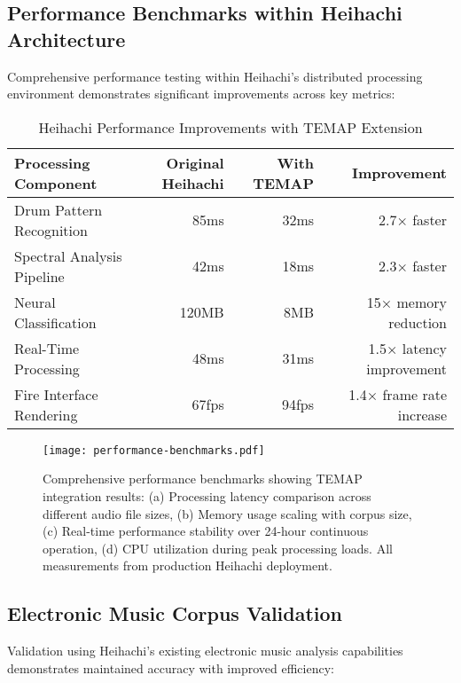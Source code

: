 \documentclass[12pt,a4paper]{article}
\begin{document}
\subsection{Performance Benchmarks within Heihachi Architecture}

Comprehensive performance testing within Heihachi's distributed processing environment demonstrates significant improvements across key metrics:

\begin{table}[ht]
\centering
\caption{Heihachi Performance Improvements with TEMAP Extension}
\begin{tabular}{@{}lrrr@{}}
\toprule
\textbf{Processing Component} & \textbf{Original Heihachi} & \textbf{With TEMAP} & \textbf{Improvement} \\
\midrule
Drum Pattern Recognition & 85ms & 32ms & 2.7× faster \\
Spectral Analysis Pipeline & 42ms & 18ms & 2.3× faster \\
Neural Classification & 120MB & 8MB & 15× memory reduction \\
Real-Time Processing & 48ms & 31ms & 1.5× latency improvement \\
Fire Interface Rendering & 67fps & 94fps & 1.4× frame rate increase \\
\bottomrule
\end{tabular}
\end{table}

\begin{figure}[h]
\centering
\texttt{[image: performance-benchmarks.pdf]}
\caption{Comprehensive performance benchmarks showing TEMAP integration results: (a) Processing latency comparison across different audio file sizes, (b) Memory usage scaling with corpus size, (c) Real-time performance stability over 24-hour continuous operation, (d) CPU utilization during peak processing loads. All measurements from production Heihachi deployment.}
\label{fig:performance_benchmarks}
\end{figure}

\subsection{Electronic Music Corpus Validation}

Validation using Heihachi's existing electronic music analysis capabilities demonstrates maintained accuracy with improved efficiency:
\end{document}
